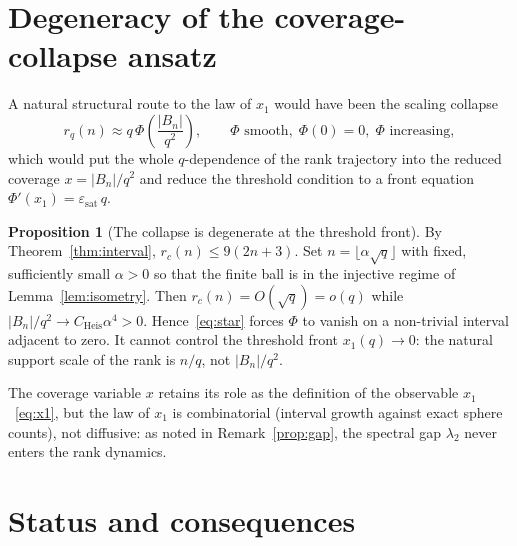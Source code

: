 \documentclass[11pt,a4paper]{article}
\theoremstyle{plain}
\theoremstyle{definition}
\newtheorem{proposition}{Proposition}
\newcommand{\Bball}{\lvert B_n\rvert}
\newcommand{\Cheis}{C_{\mathrm{Heis}}}
\newcommand{\epssat}{\varepsilon_{\mathrm{sat}}}
\newcommand{\xone}{x_1}
\begin{document}
  \section{Degeneracy of the coverage-collapse ansatz}
    \label{sec:collapse}

    A natural structural route to the law of $\xone$ would have been the scaling collapse
    \begin{equation}
      r_q(n) \approx q\,\Phi\!\left(\frac{\Bball}{q^2}\right),
      \qquad \Phi \text{ smooth},\; \Phi(0)=0,\; \Phi \text{ increasing},
      \tag{$\star$}
      \label{eq:star}
    \end{equation}
    which would put the whole $q$-dependence of the rank trajectory into the reduced coverage
    $x = \Bball/q^2$ and reduce the threshold condition to a front equation
    $\Phi'(\xone) = \epssat\,q$.

    \begin{proposition}[The collapse is degenerate at the threshold front]
      \label{prop:collapse}
      By Theorem~\ref{thm:interval}, $r_c(n) \le 9(2n+3)$.
      Set $n=\lfloor\alpha\sqrt q\rfloor$ with fixed, sufficiently small $\alpha>0$ so that the
      finite ball is in the injective regime of Lemma~\ref{lem:isometry}.
      Then $r_c(n)=O(\sqrt q)=o(q)$ while
      $\lvert B_n\rvert/q^2\to\Cheis\alpha^4>0$.
      Hence~\eqref{eq:star} forces $\Phi$ to vanish on a non-trivial interval adjacent to zero.
      It cannot control the threshold front $\xone(q)\to0$: the natural support scale of the rank
      is $n/q$, not $\lvert B_n\rvert/q^2$.
    \end{proposition}

    The coverage variable $x$ retains its role as the definition of the observable
    $\xone$~\eqref{eq:x1}, but the law of $\xone$ is combinatorial (interval growth against exact
    sphere counts), not diffusive: as noted in Remark~\ref{prop:gap}, the spectral gap
    $\lambda_2$ never enters the rank dynamics.

  \section{Status and consequences}
    \label{sec:status}
\end{document}
